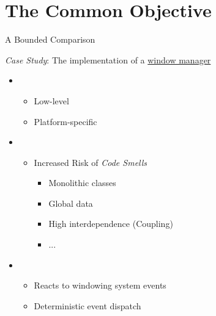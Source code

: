 
\section{The Common Objective}

\begin{secframe}{A Bounded Comparison}

    \textit{Case Study}: The implementation of a \underline{window manager}

    \begin{itemize}
        \item {}\\
            \begin{itemize}
                \item Low-level
                \item Platform-specific
            \end{itemize}

        \item {}\\
            \begin{itemize}
                \item Increased Risk of \textit{Code Smells}
                    \begin{itemize}
                        \item Monolithic classes
                        \item Global data
                        \item High interdependence (Coupling)
                        \item ...
                    \end{itemize}
            \end{itemize}

        \item {}\\
            \begin{itemize}
                \item Reacts to windowing system events
                \item Deterministic event dispatch
            \end{itemize}
    \end{itemize}

    \vfill

\end{secframe}

